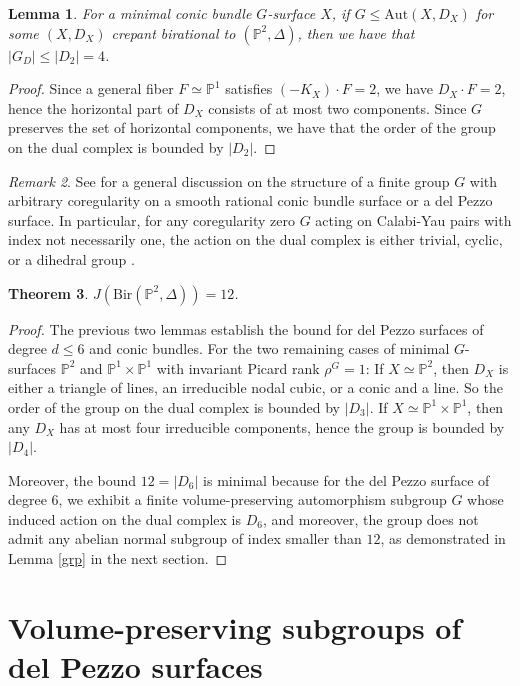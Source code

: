 \documentclass[a4paper,12pt,oneside]{amsart}
\numberwithin{equation}{section}
\newtheorem{theorem}{Theorem}[section]
\newtheorem{lemma}[theorem]{Lemma}
\theoremstyle{definition}
\theoremstyle{remark}
\newtheorem{remark}[theorem]{Remark}
\newcommand{\PP}{\mathbb{P}}
\newcommand{\Ptwo}{\mathbb{P}^2}
\newcommand{\Aut}{\mathrm{Aut}}
\begin{document}
\begin{lemma}\label{conic}
For a minimal conic bundle $G$-surface $X$, if $G\leqslant \Aut(X,D_X)$ for some $(X,D_X)$ crepant birational to $(\Ptwo, \Delta)$, then we have that $|G_D| \leq |D_2|=4$.
\end{lemma}

\begin{proof}
Since a general fiber $F\simeq \PP^1$ satisfies $(-K_X)\cdot F=2$, we have \(D_X\cdot F=2\), hence the horizontal part of $D_X$ consists of at most two components. Since $G$ preserves the set of horizontal components, we have that the order of the group on the dual complex is bounded by $|D_2|$.
\end{proof}

\begin{remark}
See \cite{przy} for a general discussion on the structure of a finite group $G$ with arbitrary coregularity on a smooth rational conic bundle surface or a del Pezzo surface. In particular, for any coregularity zero $G$ acting on Calabi-Yau pairs with index not necessarily one, the action on the dual complex is either trivial, cyclic, or a dihedral group \cite[Lemma 2.5.3]{przy}.
\end{remark}

\begin{theorem}
$J(\mathrm{Bir}(\Ptwo, \Delta))=12$.
\end{theorem}


\begin{proof}
The previous two lemmas establish the bound for del Pezzo surfaces of degree $d\leq 6$ and conic bundles. For the two remaining cases of minimal $G$-surfaces $\Ptwo$ and $\PP^1\times \PP^1$ with invariant Picard rank $\rho^G = 1$: If \(X\simeq \Ptwo\), then $D_X$ is either a triangle of lines, an irreducible nodal cubic, or a conic and a line. So the order of the group on the dual complex is bounded by \(|D_3|\). If \(X\simeq \PP^1\times\PP^1\), then any \(D_X\) has at most four irreducible components, hence the group is bounded by \(|D_4|\). 

Moreover, the bound $12 = |D_6|$ is minimal because for the del Pezzo surface of degree $6$, we exhibit a finite volume-preserving automorphism subgroup $G$ whose induced action on the dual complex is $D_6$, and moreover, the group does not admit any abelian normal subgroup of index smaller than $12$, as demonstrated in Lemma \ref{grp} in the next section.
\end{proof}

\section{Volume-preserving subgroups of del Pezzo surfaces}
\end{document}
